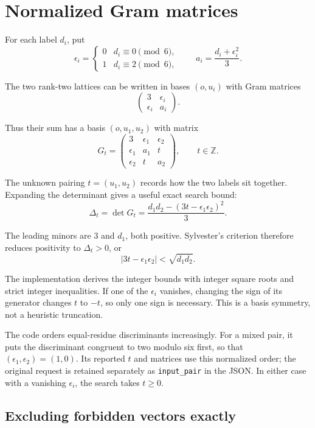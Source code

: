 \documentclass[
  american,
  11pt,
  a4paper,
]{article}
\begin{document}
\section{Normalized Gram matrices}\label{normalized-gram-matrices}

For each label \(d_i\), put
\[\epsilon_i=\begin{cases}0&d_i\equiv0\pmod6,\\1&d_i\equiv2\pmod6,\end{cases}
\qquad a_i=\frac{d_i+\epsilon_i^2}{3}.\]

The two rank-two lattices can be written in bases \((o,u_i)\) with Gram
matrices
\[\begin{pmatrix}3&\epsilon_i\\\epsilon_i&a_i\end{pmatrix}.\]

Thus their sum has a basis \((o,u_1,u_2)\) with matrix
\[G_t=\begin{pmatrix}
3&\epsilon_1&\epsilon_2\\
\epsilon_1&a_1&t\\
\epsilon_2&t&a_2
\end{pmatrix},\qquad t\in\mathbb Z.\]

The unknown pairing \(t=(u_1,u_2)\) records how the two labels sit
together. Expanding the determinant gives a useful exact search bound:
\[\Delta_t=\det G_t
=\frac{d_1d_2-(3t-\epsilon_1\epsilon_2)^2}{3}.\]

The leading minors are \(3\) and \(d_1\), both positive. Sylvester's
criterion therefore reduces positivity to \(\Delta_t>0\), or
\[|3t-\epsilon_1\epsilon_2|<\sqrt{d_1d_2}.\]

The implementation derives the integer bounds with integer square roots
and strict integer inequalities. If one of the \(\epsilon_i\) vanishes,
changing the sign of its generator changes \(t\) to \(-t\), so only one
sign is necessary. This is a basis symmetry, not a heuristic truncation.

The code orders equal-residue discriminants increasingly. For a mixed
pair, it puts the discriminant congruent to two modulo six first, so
that \((\epsilon_1,\epsilon_2)=(1,0)\). Its reported \(t\) and matrices
use this normalized order; the original request is retained separately
as \texttt{input\_pair} in the JSON. In either case with a vanishing
\(\epsilon_i\), the search takes \(t\ge0\).

\subsection{Excluding forbidden vectors
exactly}\label{excluding-forbidden-vectors-exactly}
\end{document}
